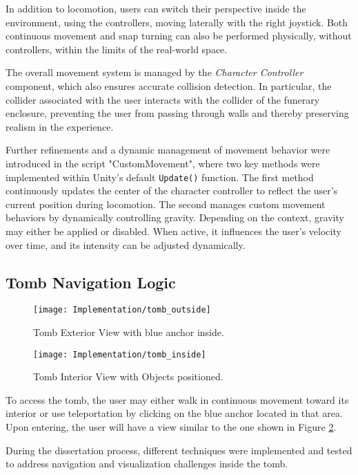 In addition to locomotion, users can switch their perspective inside the environment, using the controllers, moving laterally with the right joystick.
Both continuous movement and snap turning can also be performed physically, without controllers, within the limits of the real-world space.

The overall movement system is managed by the \emph{Character Controller} component, which also ensures accurate collision detection. In particular, the collider associated with the user interacts with the collider of the funerary enclosure, preventing the user from passing through walls and thereby preserving realism in the experience.

Further refinements and a dynamic management of movement behavior were introduced in the script "CustomMovement", where two key methods were implemented within Unity’s default \texttt{Update()} function.
The first method continuously updates the center of the character controller to reflect the user’s current position during locomotion. 
The second manages custom movement behaviors by dynamically controlling gravity. Depending on the context, gravity may either be applied or disabled. When active, it influences the user’s velocity over time, and its intensity can be adjusted dynamically.

\subsection*{Tomb Navigation Logic}
\label{sec:tomb_logic}

 \begin{figure}[h!]
    \centering
    \texttt{[image: Implementation/tomb\_outside]}
    \caption{Tomb Exterior View with blue anchor inside.}
    \label{fig:tomb_outside}    
\end{figure}

 \begin{figure}[h!]
    \centering
    \texttt{[image: Implementation/tomb\_inside]}
    \caption{Tomb Interior View with Objects positioned.}
    \label{fig:tomb_inside}    
\end{figure}

To access the tomb, the user may either walk in continuous movement toward its interior or use teleportation by clicking on the blue anchor located in that area.
Upon entering, the user will have a view similar to the one shown in Figure \ref{fig:tomb_inside}.

During the dissertation process, different techniques were implemented and tested to address navigation and visualization challenges inside the tomb.

